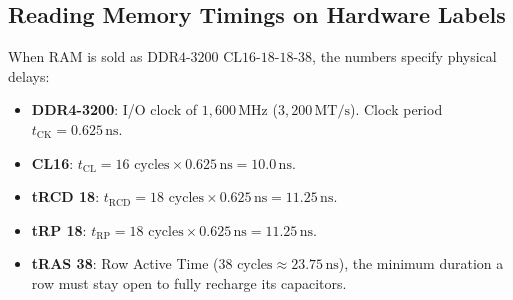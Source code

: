 \subsection{Reading Memory Timings on Hardware Labels}

When RAM is sold as $\text{DDR4-3200 CL16-18-18-38}$, the numbers specify physical delays:
\begin{itemize}[itemsep=0pt]
    \item \textbf{DDR4-3200}: I/O clock of $1{,}600\,\text{MHz}$ ($3{,}200\,\text{MT/s}$). Clock period $t_{\text{CK}} = 0.625\,\text{ns}$.
    \item \textbf{CL16}: $t_{\text{CL}} = 16\text{ cycles} \times 0.625\,\text{ns} = 10.0\,\text{ns}$.
    \item \textbf{tRCD 18}: $t_{\text{RCD}} = 18\text{ cycles} \times 0.625\,\text{ns} = 11.25\,\text{ns}$.
    \item \textbf{tRP 18}: $t_{\text{RP}} = 18\text{ cycles} \times 0.625\,\text{ns} = 11.25\,\text{ns}$.
    \item \textbf{tRAS 38}: Row Active Time ($38\text{ cycles} \approx 23.75\,\text{ns}$), the minimum duration a row must stay open to fully recharge its capacitors.
\end{itemize}

